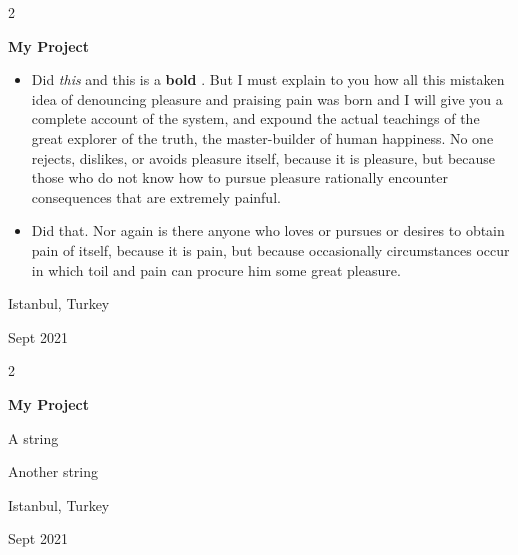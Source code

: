 \documentclass[10pt, letterpaper]{article}
\newenvironment{summary}{
    \begin{description}[
        topsep=0.10 cm,
        parsep=0.10 cm,
        partopsep=0pt,
        itemsep=0pt,
        leftmargin=0.4 cm + 10pt
    ]
}{
    \end{description}
} %
\newenvironment{highlights}{
    \begin{itemize}[
        topsep=0.10 cm,
        parsep=0.10 cm,
        partopsep=0pt,
        itemsep=0pt,
        leftmargin=0.4 cm + 10pt
    ]
}{
    \end{itemize}
} %
\newenvironment{twocolentry}[2][]{
    \onecolentry
    \def\secondColumn{#2}
    \setcolumnwidth{\fill, 4.5 cm}
    \begin{paracol}{2}
}{
    \switchcolumn \raggedleft \secondColumn
    \end{paracol}
    \endonecolentry
} %
\let\hrefWithoutArrow\href
\renewcommand{\href}[2]{\hrefWithoutArrow{#1}{\ifthenelse{\equal{#2}{}}{ }{#2 }\raisebox{.15ex}{\footnotesize \faExternalLink*}}}
\begin{document}
        \vspace{0.2 cm}

        \begin{twocolentry}{
            Istanbul, Turkey

        Sept 2021
        }
            \textbf{My Project}
            \begin{highlights}
                \item Did \textit{this} and this is a \textbf{bold} \href{https://example.com}{link}. But I must explain to you how all this mistaken idea of denouncing pleasure and praising pain was born and I will give you a complete account of the system, and expound the actual teachings of the great explorer of the truth, the master-builder of human happiness. No one rejects, dislikes, or avoids pleasure itself, because it is pleasure, but because those who do not know how to pursue pleasure rationally encounter consequences that are extremely painful.
                \item Did that. Nor again is there anyone who loves or pursues or desires to obtain pain of itself, because it is pain, but because occasionally circumstances occur in which toil and pain can procure him some great pleasure.
            \end{highlights}
        \end{twocolentry}


        \vspace{0.2 cm}

        \begin{twocolentry}{
            Istanbul, Turkey

        Sept 2021
        }
            \textbf{My Project}
            \begin{summary}
                \item A string
                \item Another string
            \end{summary}
        \end{twocolentry}


        \vspace{0.2 cm}
\end{document}
